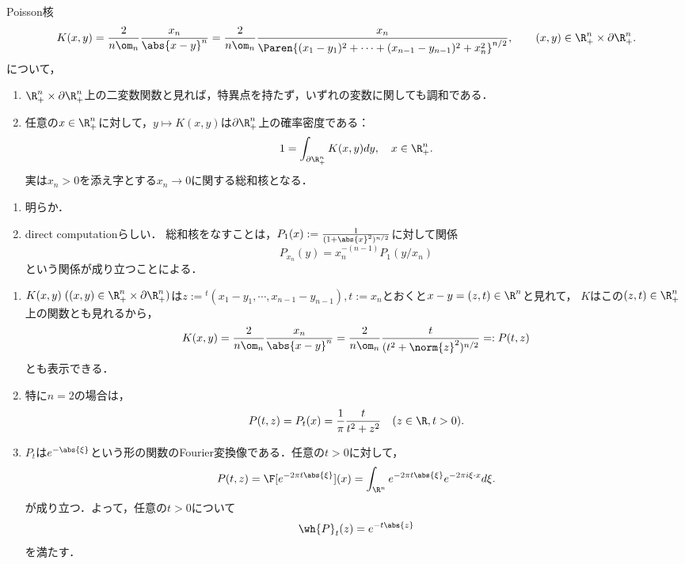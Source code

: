 \documentclass[uplatex,dvipdfmx]{jsreport}
\begin{document}
\begin{lemma}[上半平面のPoisson核は調和な総和核]\label{lemma-Poisson-Kernel-on-upper-half-plane}
    Poisson核
    \[K(x,y)=\frac{2}{n\om_n}\frac{x_n}{\abs{x-y}^n}=\frac{2}{n\om_n}\frac{x_n}{\Paren{(x_1-y_1)^2+\cdots+(x_{n-1}-y_{n-1})^2+x_n^2}^{n/2}},\qquad(x,y)\in\R^n_+\times\partial\R^n_+.\]
    について，
    \begin{enumerate}
        \item $\R^n_+\times\partial\R^n_+$上の二変数関数と見れば，特異点を持たず，いずれの変数に関しても調和である．
        \item 任意の$x\in\R^n_+$に対して，$y\mapsto K(x,y)$は$\partial\R^n_+$上の確率密度である：
        \[1=\int_{\partial\R^n_+}K(x,y)dy,\quad x\in\R^n_+.\]
        実は$x_n>0$を添え字とする$x_n\to0$に関する総和核となる．
    \end{enumerate}
\end{lemma}
\begin{Proof}\mbox{}
    \begin{enumerate}
        \item 明らか．
        \item direct computationらしい．
        総和核をなすことは，$P_1(x):=\frac{1}{(1+\abs{x}^2)^{n/2}}$に対して関係
        \[P_{x_n}(y)=x_n^{-(n-1)}P_1(y/x_n)\]
        という関係が成り立つことによる．
    \end{enumerate}
\end{Proof}
\begin{remarks}[Poisson総和核としての表式]\mbox{}\label{remark-Poisson-kernel}
    \begin{enumerate}
        \item $K(x,y)\;((x,y)\in\R^n_+\times\partial\R^n_+)$は$z:={}^t\!(x_1-y_1,\cdots,x_{n-1}-y_{n-1}),t:=x_n$とおくと$x-y=(z,t)\in\R^n$と見れて，
        $K$はこの$(z,t)\in\R^n_+$上の関数とも見れるから，
        \[K(x,y)=\frac{2}{n\om_n}\frac{x_n}{\abs{x-y}^n}=\frac{2}{n\om_n}\frac{t}{(t^2+\norm{z}^2)^{n/2}}=:P(t,z)\]
        とも表示できる．
        \item 特に$n=2$の場合は，
        \[P(t,z)=P_t(x)=\frac{1}{\pi}\frac{t}{t^2+z^2}\quad(z\in\R,t>0).\]
        \item $P_t$は$e^{-\abs{\xi}}$という形の関数のFourier変換像である．任意の$t>0$に対して，
        \[P(t,z)=\F[e^{-2\pi  t\abs{\xi}}](x)=\int_{\R^n}e^{-2\pi t\abs{\xi}}e^{-2\pi i\xi\cdot x}d\xi.\]
        が成り立つ．よって，任意の$t>0$について
        \[\wh{P}_t(z)=e^{-t\abs{z}}\]
        を満たす．
    \end{enumerate}
\end{remarks}
\end{document}
